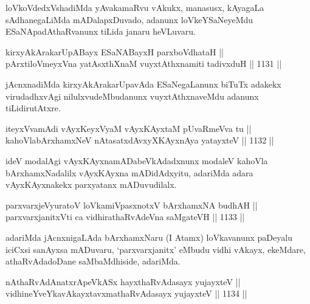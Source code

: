 \begin{artha}
loVkoVdedxVshadiMda yAvakamaRvu vAkukx, manasusx, kAyagaLa sAdhanegaLiMda mADalapxDuvado, adanunx loVkeYSaNeyeMdu ESaNApadAthaRvanunx tiLida janaru heVLuvaru.
\end{artha}


\begin{shl}
kirxyAkArakarUpABayx ESaNABayxH parxboVdhataH || \\
pArxtiloVmeyxVna yatAsxthXnaM vuyxtAthxnamiti tadivxduH \hfill || 1131 ||  
\end{shl}

\begin{artha}
jAcnxnadiMda kirxyAkArakarUpavAda ESaNegaLanunx biTuTx adakekx virudadhxvAgi nilulxvudeMbudanunx vuyxtAthxnaveMdu adanunx tiLidirutAtxre.
\end{artha}

\begin{shl}
iteyxVvamAdi vAyxKeyxVyaM vAyxKAyxtaM pUvaRmeVva tu || \\
kahoVlabArxhamxNeV nAtasatxdAvxyXKAyxnAya yatayxteV \hfill || 1132 ||  
\end{shl}

\begin{artha}
ideV modalAgi vAyxKAyxnamADabeVkAdadxnunx modaleV kahoVla bArxhamxNadalilx vAyxKAyxna mADidAdxyitu, adariMda adara vAyxKAyxnakekx parxyatanx mADuvudilalx.
\end{artha}


\begin{shl}
parxvarxjeVyuratoV loVkamiVpasxnotxV bArxhamxNA budhAH || \\
parxvarxjanitxVti ca vidhirathaRvAdeVna saMgateVH \hfill || 1133 ||  
\end{shl}

\begin{artha}
adariMda jAcnxnigaLAda bArxhamxNaru (I Atamx) loVkavanunx paDeyalu iciCxsi sanAyxsa mADuvaru, `parxvarxjanitx' eMbudu vidhi vAkayx, ekeMdare, athaRvAdadoDane saMbaMdhiside, adariMda.
\end{artha}


\begin{shl}
nAthaRvAdAnatxrApeVkASx hayxthaRvAdasayx yujayxteV || \\
vidhineYveYkavAkayxtavxmathaRvAdasayx yujayxteV \hfill || 1134 ||  
\end{shl}

